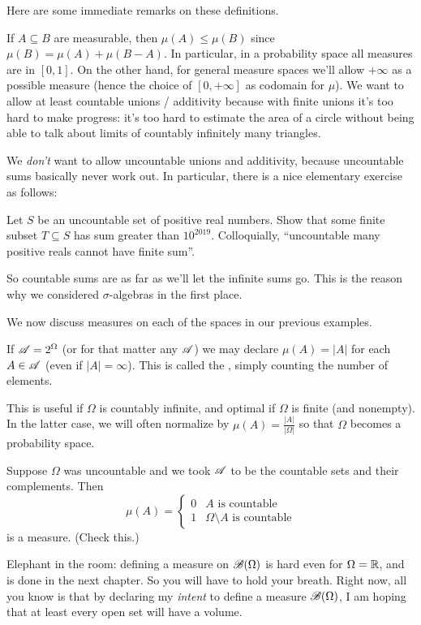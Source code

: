 \begin{remark}
Here are some immediate remarks on these definitions.
\begin{itemize}
	\ii If $A \subseteq B$ are measurable,
	then $\mu(A) \le \mu(B)$ since $\mu(B) = \mu(A) + \mu(B-A)$.
	\ii In particular, in a probability space all measures are in $[0,1]$.
	On the other hand, for general measure spaces we'll allow $+\infty$
	as a possible measure
	(hence the choice of $[0,+\infty]$ as codomain for $\mu$).
	\ii We want to allow at least countable unions / additivity
	because with finite unions it's too hard to make progress:
	it's too hard to estimate the area of a circle
	without being able to talk about limits of countably infinitely many triangles.
	\end{itemize}
\end{remark}
We \emph{don't} want to allow uncountable unions and additivity,
because uncountable sums basically never work out.
In particular, there is a nice elementary exercise as follows:
\begin{exercise}
	[Tricky]
	Let $S$ be an uncountable set of positive real numbers.
	Show that some finite subset $T \subseteq S$ has sum greater than $10^{2019}$.
	Colloquially, ``uncountable many positive reals
	cannot have finite sum''.
\end{exercise}
So countable sums are as far as we'll let the infinite sums go.
This is the reason why we considered $\sigma$-algebras in the first place.


\begin{example}
	[Measures]
	We now discuss measures on each of the spaces
	in our previous examples.
	\begin{enumerate}[(a)]
		\ii If $\mathscr A = 2^\Omega$ (or for that matter any $\mathscr A$)
		we may declare $\mu(A) = |A|$ for each $A \in \mathscr A$
		(even if $|A| = \infty$).
		This is called the ,
		simply counting the number of elements.

		This is useful if $\Omega$ is countably infinite,
		and optimal if $\Omega$ is finite (and nonempty).
		In the latter case, we will often normalize by
		$\mu(A) = \frac{|A|}{|\Omega|}$
		so that $\Omega$ becomes a probability space.

		\ii Suppose $\Omega$ was uncountable
		and we took $\mathscr A$ to be the countable sets and their complements.
		Then
		\[
			\mu(A) = \begin{cases}
				0 & \text{$A$ is countable} \\
				1 & \text{$\Omega \setminus A$ is countable}
			\end{cases}
		\]
		is a measure. (Check this.)
		
		\ii Elephant in the room:
		defining a measure on $\mathscr B(\Omega)$ is hard even for $\Omega = \mathbb R$,
		and is done in the next chapter.
		So you will have to hold your breath.
		Right now, all you know is that by declaring my \emph{intent}
		to define a measure $\mathscr B(\Omega)$,
		I am hoping that at least every open set will have a volume.
	\end{enumerate}
\end{example}

